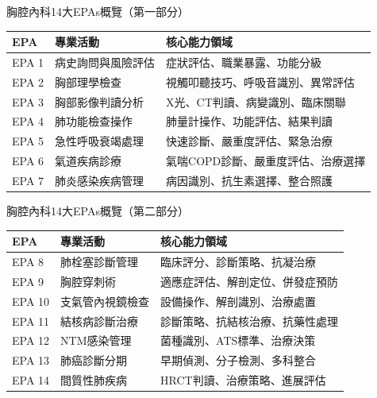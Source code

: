 \documentclass[aspectratio=169]{beamer}
\begin{document}
\begin{frame}{胸腔內科14大EPAs概覽（第一部分）}
\footnotesize
\begin{table}
\centering
\begin{tabular}{|p{1cm}|p{3.5cm}|p{6.5cm}|}
\hline
\rowcolor{emergency_blue!20}
\textbf{EPA} & \textbf{專業活動} & \textbf{核心能力領域} \\
\hline
EPA 1 & 病史詢問與風險評估 & 症狀評估、職業暴露、功能分級 \\
\hline
EPA 2 & 胸部理學檢查 & 視觸叩聽技巧、呼吸音識別、異常評估 \\
\hline
EPA 3 & 胸部影像判讀分析 & X光、CT判讀、病變識別、臨床關聯 \\
\hline
EPA 4 & 肺功能檢查操作 & 肺量計操作、功能評估、結果判讀 \\
\hline
EPA 5 & 急性呼吸衰竭處理 & 快速診斷、嚴重度評估、緊急治療 \\
\hline
EPA 6 & 氣道疾病診療 & 氣喘COPD診斷、嚴重度評估、治療選擇 \\
\hline
EPA 7 & 肺炎感染疾病管理 & 病因識別、抗生素選擇、整合照護 \\
\hline
\end{tabular}
\end{table}
\end{frame}

\begin{frame}{胸腔內科14大EPAs概覽（第二部分）}
\footnotesize
\begin{table}
\centering
\begin{tabular}{|p{1cm}|p{3.5cm}|p{6.5cm}|}
\hline
\rowcolor{emergency_blue!20}
\textbf{EPA} & \textbf{專業活動} & \textbf{核心能力領域} \\
\hline
EPA 8 & 肺栓塞診斷管理 & 臨床評分、診斷策略、抗凝治療 \\
\hline
EPA 9 & 胸腔穿刺術 & 適應症評估、解剖定位、併發症預防 \\
\hline
EPA 10 & 支氣管內視鏡檢查 & 設備操作、解剖識別、治療處置 \\
\hline
\rowcolor{emergency_red!10}
EPA 11 & \textcolor{emergency_red}{結核病診斷治療} & \textcolor{emergency_red}{診斷策略、抗結核治療、抗藥性處理} \\
\hline
\rowcolor{emergency_red!10}
EPA 12 & \textcolor{emergency_red}{NTM感染管理} & \textcolor{emergency_red}{菌種識別、ATS標準、治療決策} \\
\hline
\rowcolor{emergency_red!10}
EPA 13 & \textcolor{emergency_red}{肺癌診斷分期} & \textcolor{emergency_red}{早期偵測、分子檢測、多科整合} \\
\hline
\rowcolor{emergency_red!10}
EPA 14 & \textcolor{emergency_red}{間質性肺疾病} & \textcolor{emergency_red}{HRCT判讀、治療策略、進展評估} \\
\hline
\end{tabular}
\end{table}
\end{frame}
\end{document}
